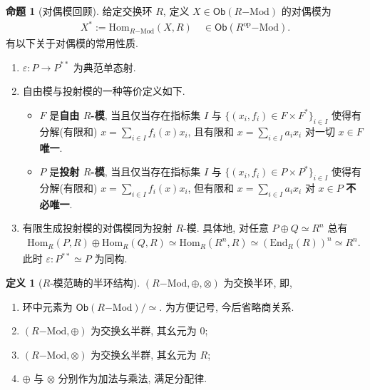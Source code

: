 \documentclass{MainStyle}
\theoremstyle{definition}
\theoremstyle{definition}
\theoremstyle{definition}
\newtheorem{definition}{定义}
\theoremstyle{definition}
\newtheorem{proposition}{命题}
\theoremstyle{definition}
\theoremstyle{definition}
\theoremstyle{definition}
\theoremstyle{remark}
\theoremstyle{remark}
\begin{document}
\begin{proposition}[对偶模回顾]
    给定交换环 $R$, 定义 $X\in \mathsf{Ob}(R\mathrm{-Mod})$ 的对偶模为
    \begin{align*}
        X^\ast:=\mathrm{Hom}_{R\mathrm{-Mod}}(X,R)\quad \in \mathsf{Ob}(R^{\mathrm{op}}\mathrm{-Mod}).
    \end{align*}
    有以下关于对偶模的常用性质.
    \begin{enumerate}
        \item $\varepsilon: P\to P^{\ast\ast}$ 为典范单态射.
        \item 自由模与投射模的一种等价定义如下.
              \begin{itemize}
                  \item $F$ 是\textbf{自由 $R$-模}, 当且仅当存在指标集 $I$ 与 $\{(x_i,f_i)\in F\times F^\ast\}_{i\in I}$ 使得有分解(有限和) $\displaystyle x=\sum _{i\in I}f_i(x)x_i$, 且有限和 $\displaystyle x=\sum _{i\in I}a_i x_i$ 对一切 $x\in F$ \textbf{唯一}.
                  \item $P$ 是\textbf{投射 $R$-模}, 当且仅当存在指标集 $I$ 与 $\{(x_i,f_i)\in P\times P^\ast\}_{i\in I}$ 使得有分解(有限和) $\displaystyle x=\sum _{i\in I}f_i(x)x_i$, 但有限和 $\displaystyle x=\sum _{i\in I}a_i x_i$ 对 $x\in P$ \textbf{不必唯一}.
              \end{itemize}
        \item 有限生成投射模的对偶模同为投射 $R$-模. 具体地, 对任意 $P\oplus Q\simeq R^n$ 总有
              \begin{align*}
                  \mathrm{Hom}_R(P,R)\oplus \mathrm{Hom}_R(Q,R)\simeq \mathrm{Hom}_R(R^n,R)\simeq (\mathrm{End}_R(R))^n\simeq R^n.
              \end{align*}
              此时 $\varepsilon: P^{\ast\ast}\simeq P$ 为同构.
    \end{enumerate}
\end{proposition}

\begin{definition}[$R$-模范畴的半环结构]
    $(R\mathrm{-Mod},\oplus, \otimes)$ 为交换半环, 即,
    \begin{enumerate}
        \item 环中元素为 $\mathsf{Ob}(R\mathrm{-Mod})/\simeq$. 为方便记号, 今后省略商关系.
        \item $(R\mathrm{-Mod},\oplus)$ 为交换幺半群, 其幺元为 $0$;
        \item $(R\mathrm{-Mod}, \otimes)$ 为交换幺半群, 其幺元为 $R$;
        \item $\oplus$ 与 $\otimes$ 分别作为加法与乘法, 满足分配律.
    \end{enumerate}
\end{definition}
\end{document}

